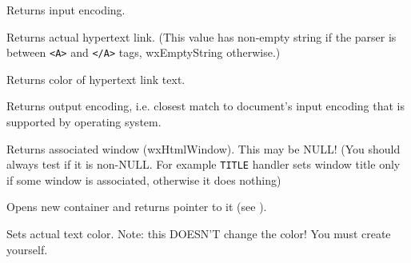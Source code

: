 
Returns input encoding.


\label{wxhtmlwinparsergetlink}


Returns actual hypertext link. (This value has non-empty
 string
if the parser is between {\tt <A>} and {\tt </A>} tags,
wxEmptyString otherwise.)


\label{wxhtmlwinparsergetlinkcolor}


Returns color of hypertext link text.


\label{wxhtmlwinparsergetoutputencoding}


Returns output encoding, i.e. closest match to document's input encoding
that is supported by operating system.

\label{wxhtmlwinparsergetwindow}


Returns associated window (wxHtmlWindow). This may be NULL! (You should always
test if it is non-NULL. For example {\tt TITLE} handler sets window
title only if some window is associated, otherwise it does nothing)


\label{wxhtmlwinparseropencontainer}


Opens new container and returns pointer to it (see ).


\label{wxhtmlwinparsersetactualcolor}


Sets actual text color. Note: this DOESN'T change the color!
You must create  yourself.

\label{wxhtmlwinparsersetalign}


